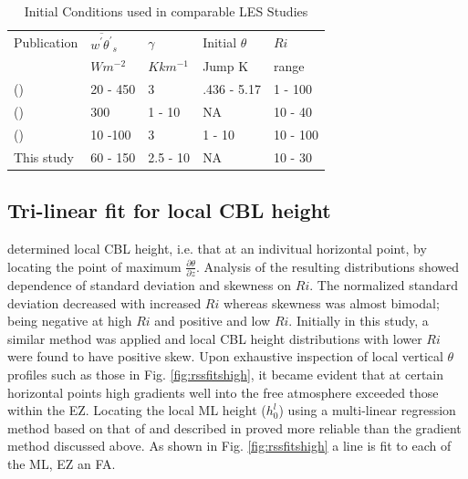 \begin{table}[htbp]
\caption[Initial Conditions used in comparable LES Studies]{Initial Conditions used in comparable LES Studies}

  
    \begin{tabular}{ p{4cm} p{1.4cm} p{1.4cm} p{1.7cm} p{1.8cm}}
    
Publication & $\overline{w^{'}\theta^{'}}_{s}$& $\gamma$& Initial $\theta$ & $Ri$ \\ 
& $Wm^{-2}$ & $Kkm^{-1}$ & Jump K & range \\ \hline
      \citeauthor{SullMoengStev} (\citeyear{SullMoengStev}) & 20 - 450& 3  &.436 - 5.17 & 1 - 100\\
      \citeauthor{FedConzMir04} (\citeyear{FedConzMir04}) & 300 & 1 - 10 & NA & 10 - 40\\ 
      \citeauthor{BrooksFowler2} (\citeyear{BrooksFowler2}) &  10 -100 &  3& 1 - 10 &10 - 100 \\
      This study & 60 - 150 & 2.5 - 10& NA & 10 - 30\\ \hline 
      
    \end{tabular}
\label{table:initconditcomp}   

\end{table}

\subsection{Tri-linear fit for local CBL height}
\cite{SullMoengStev} determined local CBL height, i.e. that at an indivitual horizontal point, by locating the point of maximum $\frac{\partial \theta}{\partial z}$.  Analysis of the resulting distributions showed dependence of standard deviation and skewness on $Ri$.  The normalized standard deviation decreased with increased $Ri$ whereas skewness was almost bimodal; being negative at high $Ri$ and positive and low $Ri$.  Initially in this study, a similar method was applied and local CBL height distributions with lower $Ri$ were found to have positive skew.  Upon exhaustive inspection of local vertical $\theta$  profiles such as those in Fig. \ref{fig:rssfitshigh}, it became evident that at certain horizontal points high gradients well into the free atmosphere exceeded those within the EZ.  Locating the local ML height ($h^{l}_{0}$) using a multi-linear regression method based on that of \citep{Vieth} and described in \citep{NChap14} proved more reliable than the gradient method discussed above.  As shown in Fig. \ref{fig:rssfitshigh} a line is fit to each of the ML, EZ an FA.\\
  
